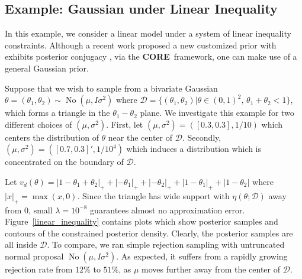 \documentclass[10pt,fleqn]{article}
\newcommand{\core}{\textbf{CORE}}
\newcommand{\mc}[1]{\mathcal{#1}}
\DeclareMathOperator{\No}{No}
\DeclareMathOperator{\1}{\mathbbm{1}}
\begin{document}
\subsection{Example: Gaussian  under Linear Inequality}
In this example, we consider a linear model under a system of linear inequality constraints. Although a
recent work proposed a new customized prior with exhibits posterior conjugacy \citep{danaher2012minkowski},
via the \core\, framework, one can make use of a general Gaussian prior. 

Suppose that we wish to sample from a bivariate Gaussian $\theta=(\theta_1,\theta_2) \sim \No \left( \mu, I\sigma^2\right)$ where $\mathcal{D}=\{(\theta_1,\theta_2) |\theta\in(0,1)^2, \, \theta_1+\theta_2<1\}$,
which forms a triangle in the $\theta_1-\theta_2$ plane.  We investigate this example for two different choices of $(\mu,\sigma^2)$. First, let $(\mu, \sigma^2)=([0.3,0.3],1/{10})$  which centers the distribution of $\theta$ near the center of $\mc D$. Secondly,  $(\mu,\sigma^2) = ([0.7,0.3]',1/10^4)$  which induces a  distribution which is concentrated on the boundary of $\mc D$. 

Let $v_d(\theta)=|1-\theta_1+\theta_2|_+ + |-\theta_1|_+ + |-\theta_2|_+ +|1-\theta_1|_+ +|1-\theta_2| $ where $|x|_+ = \max(x,0)$.  Since the triangle has wide support with $\eta(\theta;\mc D)$ away from $0$, small $\lambda=10^{-8}$
 guarantees almost no approximation error. Figure~\ref{linear_inequality} contains plots which show posterior samples and contours of the constrained posterior density. Clearly, the posterior samples are all inside
$\mc D$. To compare, we ran simple rejection sampling with untruncated normal proposal $\No ( \mu, I\sigma^2)$. As expected, it  suffers from a rapidly growing rejection rate from $12\%$ to $51\%$, as $\mu$ moves further away from the center of $\mc D$.
\end{document}

